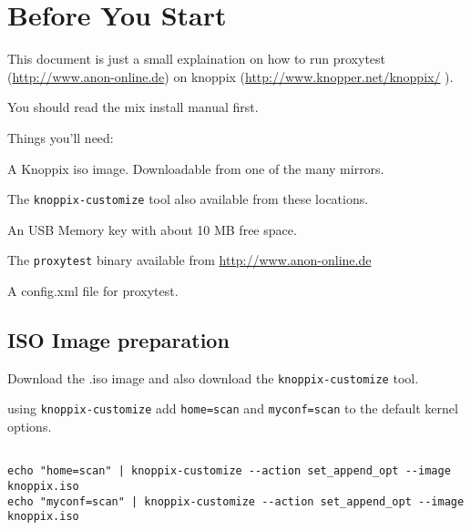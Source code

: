 \documentclass{article}
\begin{document}



\section{Before You Start}


This document is just a small explaination on how to run proxytest
(\url{http://www.anon-online.de}) on knoppix
(\url{http://www.knopper.net/knoppix/} ).

You should read the mix install manual first.


Things you'll need:

A Knoppix iso image. Downloadable from one of the many mirrors.

The \verb|knoppix-customize| tool also available from these locations.

An USB Memory key with about 10 MB free space.

The \verb|proxytest| binary available from \url{http://www.anon-online.de}

A config.xml file for proxytest.



\subsection{ISO Image preparation}


Download the .iso image and also download the \verb|knoppix-customize| tool.

using \verb|knoppix-customize| add \verb|home=scan| and \verb|myconf=scan|
to the default kernel options.

\begin{verbatim}

echo "home=scan" | knoppix-customize --action set_append_opt --image knoppix.iso 
echo "myconf=scan" | knoppix-customize --action set_append_opt --image knoppix.iso 

\end{verbatim}
\end{document}
